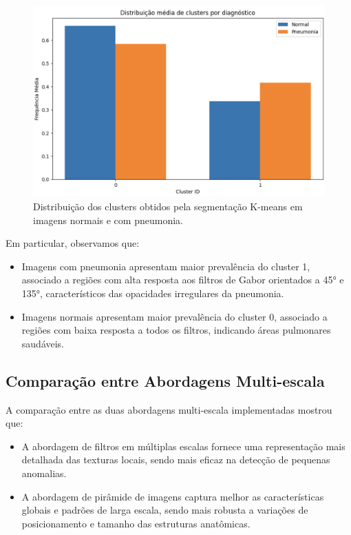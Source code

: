 \documentclass[sigconf,nonacm]{acmart}
\begin{document}
\begin{figure}[h]
  \centering
  \includegraphics[width=0.8\linewidth]{../images/cluster_distribution.png}
  \caption{Distribuição dos clusters obtidos pela segmentação K-means em imagens normais e com pneumonia.}
  \label{fig:clusters}
\end{figure}
  
Em particular, observamos que:

\begin{itemize}
  \item Imagens com pneumonia apresentam maior prevalência do cluster 1, associado a regiões com alta resposta aos filtros de Gabor orientados a 45° e 135°, característicos das opacidades irregulares da pneumonia.
  \item Imagens normais apresentam maior prevalência do cluster 0, associado a regiões com baixa resposta a todos os filtros, indicando áreas pulmonares saudáveis.
\end{itemize}

\subsection{Comparação entre Abordagens Multi-escala}

A comparação entre as duas abordagens multi-escala implementadas mostrou que:

\begin{itemize}
  \item A abordagem de filtros em múltiplas escalas fornece uma representação mais detalhada das texturas locais, sendo mais eficaz na detecção de pequenas anomalias.
  \item A abordagem de pirâmide de imagens captura melhor as características globais e padrões de larga escala, sendo mais robusta a variações de posicionamento e tamanho das estruturas anatômicas.
\end{itemize}
\end{document}
